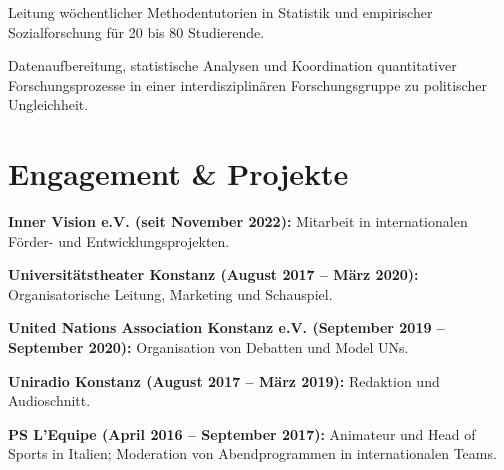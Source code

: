\documentclass[letterpaper]{deedy-resume} %
\begin{document}
\begin{minipage}[t]{0.66\textwidth}
\begin{tightitemize}
\item Leitung wöchentlicher Methodentutorien in Statistik und empirischer Sozialforschung für 20 bis 80 Studierende.
\item Datenaufbereitung, statistische Analysen und Koordination quantitativer Forschungsprozesse in einer interdisziplinären Forschungsgruppe zu politischer Ungleichheit.
\end{tightitemize}
\sectionspace

\section{Engagement \& Projekte}
\vspace{\topsep}
\begin{tightitemize}
\item \textbf{Inner Vision e.V. (seit November 2022):} Mitarbeit in internationalen Förder- und Entwicklungsprojekten.
\item \textbf{Universitätstheater Konstanz (August 2017 – März 2020):} Organisatorische Leitung, Marketing und Schauspiel.
\item \textbf{United Nations Association Konstanz e.V. (September 2019 – September 2020):} Organisation von Debatten und Model UNs.
\item \textbf{Uniradio Konstanz (August 2017 – März 2019):} Redaktion und Audioschnitt.
\item \textbf{PS L'Equipe (April 2016 – September 2017):} Animateur und Head of Sports in Italien; Moderation von Abendprogrammen in internationalen Teams.
\end{tightitemize}


\end{minipage} %

\end{document}
